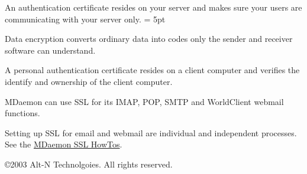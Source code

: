 \documentclass[10pt]{article}
\begin{document}
\begin{minipage}[t]{.66\linewidth}
An authentication certificate resides on your server and makes sure your users are communicating with your server only.
\parskip = 5pt

Data encryption converts ordinary data into codes only the sender and receiver software can understand.

A personal authentication certificate resides on a client computer and verifies the identify and ownership of the client computer. 

MDaemon can use SSL for its IMAP, POP, SMTP and WorldClient webmail functions. 

Setting up SSL for email and webmail are individual and independent processes. See the \href{http://files.altn.com/HowTo/}{MDaemon SSL HowTos}.

{\small \copyright 2003 Alt-N Technolgoies. All rights reserved.}
\end{minipage}
\end{document}
